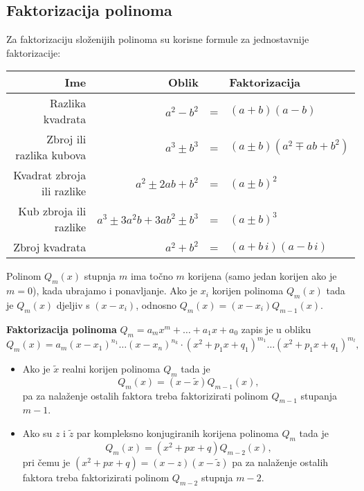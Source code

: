 \subsection{Faktorizacija polinoma}

Za faktorizaciju složenijih polinoma su korisne formule za jednostavnije
faktorizacije:

\begin{center}
    \begin{tabular}{r|rcl}
        Ime & Oblik && Faktorizacija \\
        \hline
        Razlika kvadrata & $a^2 - b^2$ &=& $(a+b)(a-b)$ \\
        Zbroj ili razlika kubova & $a^3 \pm b^3$ &=& $(a \pm b)(a^2 \mp ab + b^2)$ \\
        Kvadrat zbroja ili razlike & $a^2 \pm 2ab + b^2$ &=& $(a \pm b)^2$ \\
        Kub zbroja ili razlike & $a^3 \pm 3a^2b + 3ab^2 \pm b^3$ &=& $(a \pm b)^3$ \\
        \hline
        \hline
        Zbroj kvadrata & $a^2 + b^2$ &=& $(a+b\,i)(a-b\,i)$ \\
    \end{tabular}
\end{center}

\par
Polinom $Q_m(x)$ stupnja $m$ ima točno $m$ korijena (samo jedan korijen ako je
$m=0$), kada ubrajamo i ponavljanje. Ako je $x_i$ korijen polinoma $Q_m(x)$ tada
je $Q_m(x)$ djeljiv s $(x-x_i)$, odnosno $Q_m(x) = (x-x_i)Q_{m-1}(x)$.

\textbf{Faktorizacija polinoma} $Q_m=a_mx^m+\dots+a_1x+a_0$ zapis je u obliku
$$
Q_m(x) = a_m(x-x_1)^{n_1}\dots(x-x_n)^{n_k}\cdot(x^2+p_1x+q_1)^{m_1}\dots(x^2+p_1x+q_1)^{m_l},
$$

\begin{itemize}
    \item Ako je $\tilde{x}$ realni korijen polinoma $Q_m$ tada je
    $$
    Q_m(x) = (x-\tilde{x})Q_{m-1}(x),
    $$
    pa za nalaženje ostalih faktora treba faktorizirati polinom $Q_{m-1}$
    stupanja $m-1$.
    \item Ako su $z$ i $\tilde{z}$ par kompleksno konjugiranih korijena polinoma
    $Q_m$ tada je
    $$
    Q_m(x) = (x^2+px+q)Q_{m-2}(x),
    $$
    pri čemu je $(x^2+px+q) = (x-z)(x-\tilde{z})$ pa za nalaženje ostalih
    faktora treba faktorizirati polinom $Q_{m-2}$ stupnja $m-2$.
\end{itemize}

